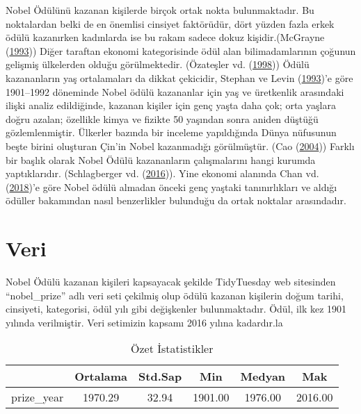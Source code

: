 \documentclass[
  12pt,
]{article}
\begin{document}
Nobel Ödülünü kazanan kişilerde birçok ortak nokta bulunmaktadır. Bu noktalardan belki de en önemlisi cinsiyet faktörüdür, dört yüzden fazla erkek ödülü kazanırken kadınlarda ise bu rakam sadece dokuz kişidir.(McGrayne (\protect\hyperlink{ref-mcgrayne1993nobel}{1993})) Diğer taraftan ekonomi kategorisinde ödül alan bilimadamlarının çoğunun gelişmiş ülkelerden olduğu görülmektedir. (Özateşler vd. (\protect\hyperlink{ref-ozatecsler1998nobel}{1998}))
Ödülü kazananların yaş ortalamaları da dikkat çekicidir, Stephan ve Levin (\protect\hyperlink{ref-stephan1993age}{1993})'e göre 1901--1992 döneminde Nobel ödülü kazananlar için yaş ve üretkenlik arasındaki ilişki analiz edildiğinde, kazanan kişiler için genç yaşta daha çok; orta yaşlara doğru azalan; özellikle kimya ve fizikte 50 yaşından sonra aniden düştüğü gözlemlenmiştir. Ülkerler bazında bir inceleme yapıldığında Dünya nüfusunun beşte birini oluşturan Çin'in Nobel kazanmadığı görülmüştür. (Cao (\protect\hyperlink{ref-cao2004chinese}{2004}))
Farklı bir başlık olarak Nobel Ödülü kazananların çalışmalarını hangi kurumda yaptıklarıdır. (Schlagberger vd. (\protect\hyperlink{ref-schlagberger2016institutions}{2016})). Yine ekonomi alanında Chan vd. (\protect\hyperlink{ref-chan2018relation}{2018})'e göre Nobel ödülü almadan önceki genç yaştaki tanınırlıkları ve aldığı ödüller bakamından nasıl benzerlikler bulunduğu da ortak noktalar arasındadır.

\hypertarget{veri}{%
\section{Veri}\label{veri}}

Nobel Ödülü kazanan kişileri kapsayacak şekilde TidyTuesday web sitesinden ``nobel\_prize''
adlı veri seti çekilmiş olup ödülü kazanan kişilerin doğum tarihi, cinsiyeti, kategorisi, ödül yılı
gibi değişkenler bulunmaktadır. Ödül, ilk kez 1901 yılında verilmiştir. Veri setimizin kapsamı 2016 yılına kadardır.la

\begin{table}[ht]
\centering
\caption{Özet İstatistikler} 
\label{tab:ozet}
\begin{tabular}{lccccc}
  \toprule
 & Ortalama & Std.Sap & Min & Medyan & Mak \\ 
  \midrule
prize\_year & 1970.29 & 32.94 & 1901.00 & 1976.00 & 2016.00 \\ 
   \bottomrule
\end{tabular}
\end{table}
\end{document}
